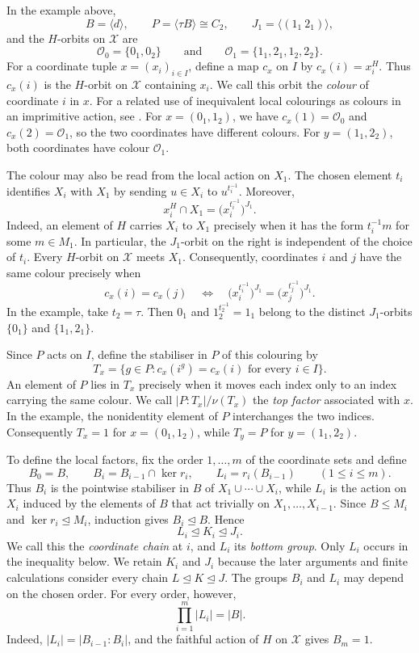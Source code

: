 \documentclass[10pt]{amsart}
\theoremstyle{definition}
\renewcommand{\leq}{\leqslant}
\numberwithin{equation}{section}
\numberwithin{table}{section}
\begin{document}
In the example above,
$$
  B=\langle d\rangle,\qquad P=\langle\tau B\rangle\cong C_2,
  \qquad J_1=\langle(1_1\ 2_1)\rangle,
$$
and the $H$-orbits on $\mathcal X$ are
$$
  \mathcal O_0=\{0_1,0_2\}\qquad\text{and}\qquad
  \mathcal O_1=\{1_1,2_1,1_2,2_2\}.
$$
For a coordinate tuple $x=(x_i)_{i\in I}$, define a map $c_x$ on $I$ by
$c_x(i)=x_i^H$. Thus $c_x(i)$ is the $H$-orbit on $\mathcal X$ containing
$x_i$. We call this orbit the {\it colour} of coordinate $i$ in $x$. For a
related use of inequivalent local colourings as colours in an imprimitive action, see
\cite[Section~2.3]{SabatiniStabilizers}. For
$x=(0_1,1_2)$, we have $c_x(1)=\mathcal O_0$ and
$c_x(2)=\mathcal O_1$, so the two coordinates have different colours. For
$y=(1_1,2_2)$, both coordinates have colour $\mathcal O_1$.

The colour may also be read from the local action on $X_1$. The chosen
element $t_i$ identifies $X_i$ with $X_1$ by sending $u\in X_i$ to
$u^{t_i^{-1}}$. Moreover,
$$
  x_i^H\cap X_1=\bigl(x_i^{t_i^{-1}}\bigr)^{J_1}.
$$
Indeed, an element of $H$ carries $X_i$ to $X_1$ precisely when it has the
form $t_i^{-1}m$ for some $m\in M_1$. In particular, the $J_1$-orbit on the
right is independent of the choice of $t_i$. Every $H$-orbit on
$\mathcal X$ meets $X_1$. Consequently, coordinates $i$ and $j$ have the
same colour precisely when
$$
  c_x(i)=c_x(j)
  \quad\Longleftrightarrow\quad
  \bigl(x_i^{t_i^{-1}}\bigr)^{J_1}
  =\bigl(x_j^{t_j^{-1}}\bigr)^{J_1}.
$$
In the example, take $t_2=\tau$. Then $0_1$ and
$1_2^{t_2^{-1}}=1_1$ belong to the distinct
$J_1$-orbits $\{0_1\}$ and $\{1_1,2_1\}$.

Since $P$ acts on $I$, define the stabiliser in $P$ of this colouring by
$$
  T_x=\{g\in P:c_x(i^g)=c_x(i)\text{ for every }i\in I\}.
$$
An element of $P$ lies in $T_x$ precisely when it moves each index only to an
index carrying the same colour. We call $|P:T_x|/\nu(T_x)$ the {\it top
factor} associated with $x$. In the example, the nonidentity element of $P$
interchanges the two indices. Consequently $T_x=1$ for $x=(0_1,1_2)$, while
$T_y=P$ for $y=(1_1,2_2)$.

To define the local factors, fix the order $1,\ldots,m$ of the coordinate
sets and define
$$
  B_0=B,\qquad
  B_i=B_{i-1}\cap\ker r_i,\qquad
  L_i=r_i(B_{i-1})\qquad(1\leq i\leq m).
$$
Thus $B_i$ is the pointwise stabiliser in $B$ of
$X_1\cup\cdots\cup X_i$, while $L_i$ is the action on $X_i$ induced by the elements
of $B$ that act trivially on $X_1,\ldots,X_{i-1}$. Since $B\leq M_i$ and
$\ker r_i\trianglelefteq M_i$, induction gives $B_i\trianglelefteq B$. Hence
$$
  L_i\trianglelefteq K_i\trianglelefteq J_i.
$$
We call this the {\it coordinate chain} at $i$, and $L_i$ its
{\it bottom group}. Only $L_i$ occurs in the inequality below. We retain
$K_i$ and $J_i$ because the later arguments and finite calculations consider
every chain $L\trianglelefteq K\trianglelefteq J$. The groups $B_i$ and
$L_i$ may depend on the chosen order. For every order, however,
$$
  \prod_{i=1}^m|L_i|=|B|.
$$
Indeed, $|L_i|=|B_{i-1}:B_i|$, and the faithful action of $H$ on
$\mathcal X$ gives $B_m=1$.
\end{document}
